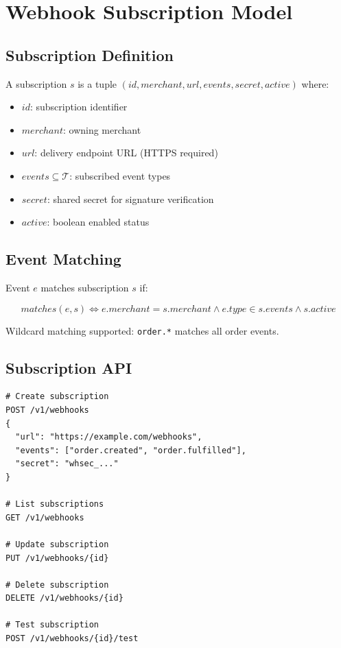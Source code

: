 \section{Webhook Subscription Model}


\subsection{Subscription Definition}

\begin{definition}
A subscription $s$ is a tuple $(id, merchant, url, events, secret, active)$ where:
\begin{itemize}
    \item $id$: subscription identifier
    \item $merchant$: owning merchant
    \item $url$: delivery endpoint URL (HTTPS required)
    \item $events \subseteq \mathcal{T}$: subscribed event types
    \item $secret$: shared secret for signature verification
    \item $active$: boolean enabled status
\end{itemize}
\end{definition}

\subsection{Event Matching}

Event $e$ matches subscription $s$ if:

\begin{equation}
matches(e, s) \iff e.merchant = s.merchant \land e.type \in s.events \land s.active
\end{equation}

Wildcard matching supported: \texttt{order.*} matches all order events.

\subsection{Subscription API}

\begin{lstlisting}[caption=Subscription Management]
# Create subscription
POST /v1/webhooks
{
  "url": "https://example.com/webhooks",
  "events": ["order.created", "order.fulfilled"],
  "secret": "whsec_..."
}

# List subscriptions
GET /v1/webhooks

# Update subscription
PUT /v1/webhooks/{id}

# Delete subscription
DELETE /v1/webhooks/{id}

# Test subscription
POST /v1/webhooks/{id}/test
\end{lstlisting}

